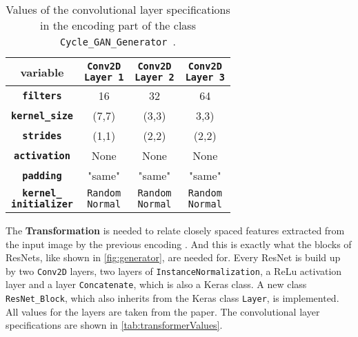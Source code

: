 \documentclass[fleqn,10pt]{SelfArx} %
\begin{document}
\begin{table}[htb]
\centering
\caption{Values of the convolutional layer specifications in the encoding part of the class \texttt{Cycle\_GAN\_Generator}~\cite{image-to-image-ccan}.}
\label{tab:encoderValues}
\begin{tabular}{c c c c}
\textbf{variable} & \makecell[cc]{\textbf{\texttt{Conv2D}} \\ \textbf{\texttt{Layer 1}}} & \makecell[cc]{\textbf{\texttt{Conv2D}} \\ \textbf{\texttt{Layer 2}}} & \makecell[cc]{\textbf{\texttt{Conv2D}} \\ \textbf{\texttt{Layer 3}}} \\ \hline
\textbf{\texttt{filters}} & 16 & 32 & 64 \\ \hline
\textbf{\texttt{kernel\_size}} & (7,7) & (3,3) & 3,3) \\ \hline
\textbf{\texttt{strides}} & (1,1) &  (2,2) & (2,2) \\ \hline
\textbf{\texttt{activation}} & None & None & None \\ \hline 
\textbf{\texttt{padding}} & "same" & "same" & "same" \\ \hline
\makecell[cc]{\textbf{\texttt{kernel\_}} \\ \textbf{\texttt{initializer}}} & \makecell[cc]{\texttt{Random} \\ \texttt{Normal}} & \makecell[cc]{\texttt{Random} \\ \texttt{Normal}} & \makecell[cc]{\texttt{Random} \\ \texttt{Normal}} \\ \hline
\end{tabular}
\end{table}

The \textbf{Transformation} is needed to relate closely spaced features extracted from the input image by the previous encoding \cite{Introduction-to-Cycle-GANs}. And this is exactly what the blocks of \acp{ResNet}, like shown in \autoref{fig:generator}, are needed for. Every \ac{ResNet} is build up by two \texttt{Conv2D} layers, two layers of \texttt{InstanceNormalization}, a \ac{ReLu} activation layer and a layer \texttt{Concatenate}, which is also a Keras class. A new class \texttt{ResNet\_Block}, which also inherits from the Keras class \texttt{Layer}, is implemented. All values for the layers are taken from the paper. The convolutional layer specifications are shown in \autoref{tab:transformerValues}.
\end{document}
